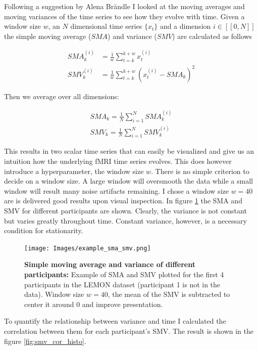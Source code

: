 Following a suggestion by Alena Brändle I looked at the moving averages and moving variances of the time series to see how they evolve with time. Given a window size $w$,
an $N$ dimensional time series $\{x_t\}$ and a dimension $i \in [\![0, N]\!]$  the simple moving average ($SMA$) and variance ($SMV$) are calculated as follows

\begin{align}
    SMA_k^{(i)} &= \frac{1}{w} \sum_{t=k}^{k+w} x_t^{(i)} \\
    SMV_k^{(i)} &= \frac{1}{w} \sum_{t=k}^{k+w} (x_t^{(i)} - SMA_k)^2
\end{align}

Then we average over all dimensions:

\begin{align}
    SMA_k = \frac{1}{N} \sum_{i=1}^{N} SMA_k^{(i)} \\
    SMV_k = \frac{1}{N} \sum_{i=1}^{N} SMV_k^{(i)}
\end{align}

This results in two scalar time series that can easily be visualized and give us an intuition how the underlying fMRI time series evolves. This does however introduce a 
hyperparameter, the window size $w$. There is no simple criterion to decide on a window size. A large window will oversmooth the data while a small window will result 
many noise artifacts remaining. I chose a window size $w=40$ are is delivered good results upon visual inspection.
In figure \ref{fig:sma_smv_example} the SMA and SMV for different participants are shown. Clearly, the variance is not constant but varies greatly 
throughout time. Constant variance, however, is a necessary condition for stationarity. 

\begin{figure}
    \texttt{[image: Images/example\_sma\_smv.png]}
    \caption[Simple moving average and variance of different participants]{\textbf{Simple moving average and variance of different participants: } Example of SMA and SMV plotted
    for the first 4 participants in the LEMON dataset (participant 1 is not in the data). Window size $w=40$, the mean of the SMV is subtracted to center it around 
    $0$ and improve presentation.}
    \label{fig:sma_smv_example}
\end{figure}

To quantify the relationship between variance and time I calculated the correlation between them for each participant's SMV. The result is shown in the figure \ref{fig:smv_cor_histo}.

